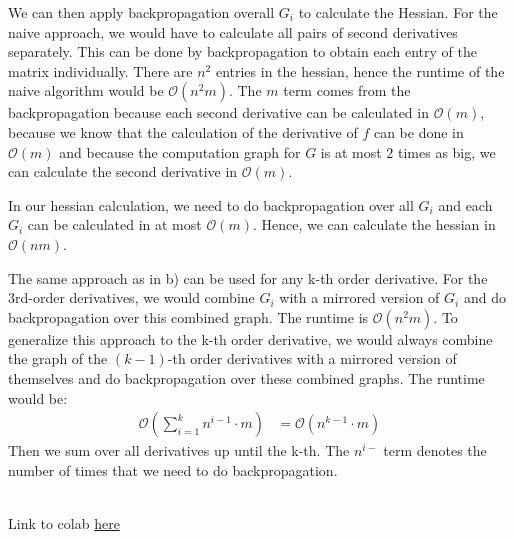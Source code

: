 \documentclass[a4paper,12pt]{ETHexercise}
\begin{document}
\begin{question}
\begin{subquestion}
		We can then apply backpropagation overall $G_i$ to calculate the Hessian.
		For the naive approach, we would have to calculate all pairs of second derivatives separately. This can be done by backpropagation to obtain each entry of the matrix individually. There are $n^2$ entries in the hessian, hence the runtime of the naive algorithm would be $\mathcal{O}(n^2 m)$. The $m$ term comes from the backpropagation because each second derivative can be calculated in $\mathcal{O}(m)$, because we know that the calculation of the derivative of $f$ can be done in $\mathcal{O}(m)$ and because the computation graph for $G$ is at most $2$ times as big, we can calculate the second derivative in $\mathcal{O}(m)$.

		In our hessian calculation, we need to do backpropagation over all $G_i$ and each $G_i$ can be calculated in at most $\mathcal{O}(m)$. Hence, we can calculate the hessian in $\mathcal{O}(nm)$.
	\end{subquestion}

	\begin{subquestion}
		The same approach as in b) can be used for any k-th order derivative. For the 3rd-order derivatives, we would combine $G_i$ with a mirrored version of $G_i$ and do backpropagation over this combined graph. The runtime is $\mathcal{O}(n^2m)$. To generalize this approach to the k-th order derivative, we would always combine the graph of the $(k-1)$-th order derivatives with a mirrored version of themselves and do backpropagation over these combined graphs. The runtime would be:
		\begin{align}
			\mathcal{O}\left(\sum_{i=1}^{k} n^{i-1} \cdot m \right) & = \mathcal{O}(n^{k-1} \cdot m) \nonumber
		\end{align}
		Then we sum over all derivatives up until the k-th. The $n^{i-}$ term denotes the number of times that we need to do backpropagation.
	\end{subquestion}
\end{question}

\begin{question}\\
	Link to colab \href{https://colab.research.google.com/drive/1KIUgSEl3ZjgDLufJk2K3ciZPu7Tq23Ab?usp=sharing}{here}
\end{question}
\end{document}
